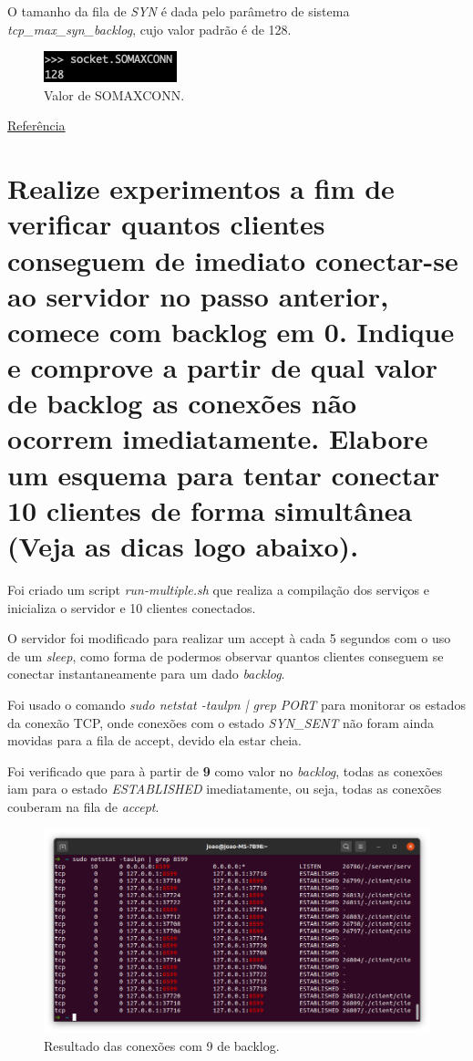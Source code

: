 \documentclass[12pt,a4paper]{report}
\begin{document}
O tamanho da fila de \emph{SYN} é dada pelo parâmetro de sistema \emph{tcp\_max\_syn\_backlog}, cujo valor padrão é de 128.

\begin{figure}[H]
  \includegraphics[width=\linewidth]{maxcon.png}
  \caption{Valor de SOMAXCONN.}
\end{figure}

\href{http://veithen.io/2014/01/01/how-tcp-backlog-works-in-linux.html}{Referência}

\section{Realize experimentos a fim de verificar quantos clientes conseguem de imediato
conectar-se ao servidor no passo anterior, comece com backlog em 0. Indique e
comprove a partir de qual valor de backlog as conexões não ocorrem imediatamente.
Elabore um esquema para tentar conectar 10 clientes de forma simultânea (Veja as
dicas logo abaixo).}

Foi criado um script \emph{run-multiple.sh} que realiza a compilação dos serviços e inicializa o servidor e 10 clientes conectados.

O servidor foi modificado para realizar um accept à cada 5 segundos com o uso de um \emph{sleep}, como forma de podermos observar quantos clientes conseguem se conectar instantaneamente para um dado \emph{backlog}.

Foi usado o comando \emph{sudo netstat -taulpn | grep PORT} para monitorar os estados da conexão TCP, onde conexões com o estado \emph{SYN\_SENT} não foram ainda movidas para a fila de accept, devido ela estar cheia.

Foi verificado que para à partir de \textbf{9} como valor no \emph{backlog}, todas as conexões iam para o estado \emph{ESTABLISHED} imediatamente, ou seja, todas as conexões couberam na fila de \emph{accept}.

\begin{figure}[H]
  \includegraphics[width=\linewidth]{9-back.png}
  \caption{Resultado das conexões com 9 de backlog.}
\end{figure}
\end{document}
